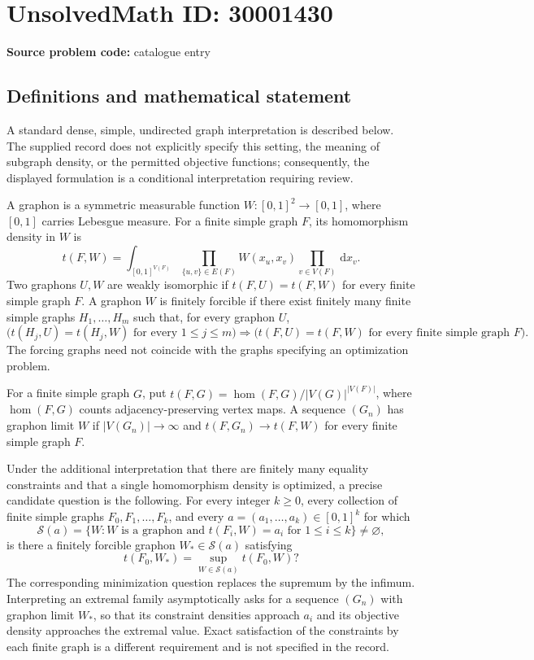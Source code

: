 \documentclass[11pt]{article}
\newcommand{\dd}{\,\mathrm{d}}
\begin{document}
\section*{UnsolvedMath ID: 30001430}
\textbf{Source problem code:} catalogue entry
\subsection{Definitions and mathematical statement}
A standard dense, simple, undirected graph interpretation is described below. The supplied record does not explicitly specify this setting, the meaning of subgraph density, or the permitted objective functions; consequently, the displayed formulation is a conditional interpretation requiring review.

A graphon is a symmetric measurable function \(W:[0,1]^2\to[0,1]\), where \([0,1]\) carries Lebesgue measure. For a finite simple graph \(F\), its homomorphism density in \(W\) is
\[
 t(F,W)=\int_{[0,1]^{V(F)}}\prod_{\{u,v\}\in E(F)}W(x_u,x_v)\prod_{v\in V(F)}\dd x_v.
\]
Two graphons \(U,W\) are weakly isomorphic if \(t(F,U)=t(F,W)\) for every finite simple graph \(F\). A graphon \(W\) is finitely forcible if there exist finitely many finite simple graphs \(H_1,\ldots,H_m\) such that, for every graphon \(U\),
\[
 \bigl(t(H_j,U)=t(H_j,W)\text{ for every }1\leq j\leq m\bigr)
 \Longrightarrow
 \bigl(t(F,U)=t(F,W)\text{ for every finite simple graph }F\bigr).
\]
The forcing graphs need not coincide with the graphs specifying an optimization problem.

For a finite simple graph \(G\), put \(t(F,G)=\operatorname{hom}(F,G)/|V(G)|^{|V(F)|}\), where \(\operatorname{hom}(F,G)\) counts adjacency-preserving vertex maps. A sequence \((G_n)\) has graphon limit \(W\) if \(|V(G_n)|\to\infty\) and \(t(F,G_n)\to t(F,W)\) for every finite simple graph \(F\).

Under the additional interpretation that there are finitely many equality constraints and that a single homomorphism density is optimized, a precise candidate question is the following. For every integer \(k\geq0\), every collection of finite simple graphs \(F_0,F_1,\ldots,F_k\), and every \(a=(a_1,\ldots,a_k)\in[0,1]^k\) for which
\[
 \mathcal S(a)=\{W:W\text{ is a graphon and }t(F_i,W)=a_i\text{ for }1\leq i\leq k\}\ne\varnothing,
\]
is there a finitely forcible graphon \(W_*\in\mathcal S(a)\) satisfying
\[
 t(F_0,W_*)=\sup_{W\in\mathcal S(a)}t(F_0,W)?
\]
The corresponding minimization question replaces the supremum by the infimum. Interpreting an extremal family asymptotically asks for a sequence \((G_n)\) with graphon limit \(W_*\), so that its constraint densities approach \(a_i\) and its objective density approaches the extremal value. Exact satisfaction of the constraints by each finite graph is a different requirement and is not specified in the record.
\end{document}
